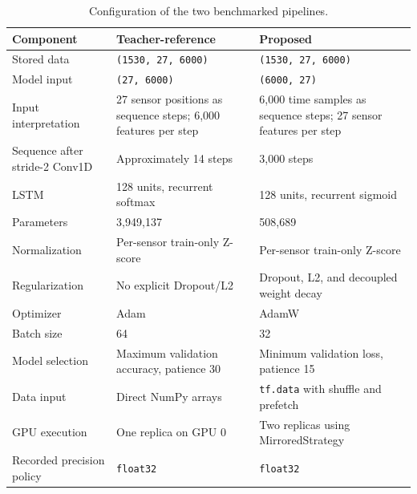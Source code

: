 \documentclass[11pt,a4paper]{article}
\begin{document}
\begin{table}[htbp]
\centering
\caption{Configuration of the two benchmarked pipelines.}
\begin{tabularx}{\textwidth}{@{}p{3.4cm}XX@{}}
\toprule
\textbf{Component} &
\textbf{Teacher-reference} &
\textbf{Proposed} \\
\midrule
Stored data
& \texttt{(1530, 27, 6000)}
& \texttt{(1530, 27, 6000)} \\

Model input
& \texttt{(27, 6000)}
& \texttt{(6000, 27)} \\

Input interpretation
& 27 sensor positions as sequence steps; 6,000 features per step
& 6,000 time samples as sequence steps; 27 sensor features per step \\

Sequence after stride-2 Conv1D
& Approximately 14 steps
& 3,000 steps \\

LSTM
& 128 units, recurrent softmax
& 128 units, recurrent sigmoid \\

Parameters
& 3,949,137
& 508,689 \\

Normalization
& Per-sensor train-only Z-score
& Per-sensor train-only Z-score \\

Regularization
& No explicit Dropout/L2
& Dropout, L2, and decoupled weight decay \\

Optimizer
& Adam
& AdamW \\

Batch size
& 64
& 32 \\

Model selection
& Maximum validation accuracy, patience 30
& Minimum validation loss, patience 15 \\

Data input
& Direct NumPy arrays
& \texttt{tf.data} with shuffle and prefetch \\

GPU execution
& One replica on GPU 0
& Two replicas using MirroredStrategy \\

Recorded precision policy
& \texttt{float32}
& \texttt{float32} \\
\bottomrule
\end{tabularx}
\end{table}
\end{document}
